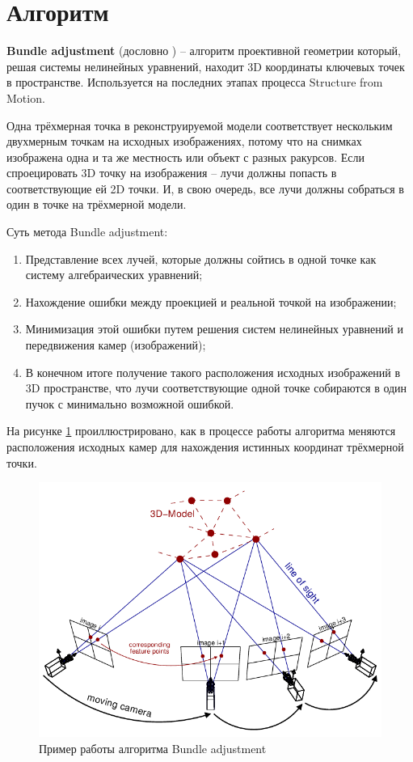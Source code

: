 \section{Алгоритм }

\textbf{Bundle adjustment} (дословно ) -- алгоритм проективной геометрии который, решая системы нелинейных уравнений, находит 3D координаты ключевых точек в пространстве. Используется на последних этапах процесса Structure from Motion.

Одна трёхмерная точка в реконструируемой модели соответствует нескольким двухмерным точкам на исходных изображениях, потому что на снимках изображена одна и та же местность или объект с разных ракурсов. Если спроецировать 3D точку на изображения -- лучи должны попасть в соответствующие ей 2D точки. И, в свою очередь, все лучи должны собраться в один  в точке на трёхмерной модели.

Суть метода Bundle adjustment:
\begin{enumerate}
    \item Представление всех лучей, которые должны сойтись в одной точке как систему алгебраических уравнений;
    \item Нахождение ошибки между проекцией и реальной точкой на изображении;
    \item Минимизация этой ошибки путем решения систем нелинейных уравнений и передвижения камер (изображений);
    \item В конечном итоге получение такого расположения исходных изображений в 3D пространстве, что лучи соответствующие одной точке собираются в один пучок с минимально возможной ошибкой.
\end{enumerate}

На рисунке \ref{fig:ba} проиллюстрировано, как в процессе работы алгоритма меняются расположения исходных камер для нахождения истинных координат трёхмерной точки.

\begin{figure}[h]
    \centering
    \includegraphics[width=1\textwidth]{images/bundle_adjustment.png}
    \caption{Пример работы алгоритма Bundle adjustment}
    \label{fig:ba}
\end{figure}